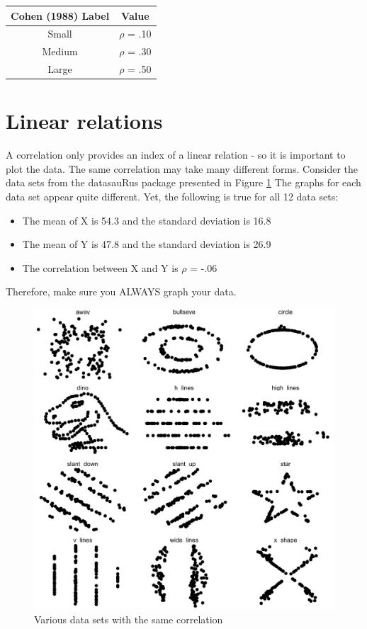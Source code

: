 \documentclass[
]{krantz}
\providecommand{\tightlist}{%
  \setlength{\itemsep}{0pt}\setlength{\parskip}{0pt}}
\begin{document}
\begin{longtable}[]{@{}cc@{}}
\toprule
Cohen (1988) Label & Value\tabularnewline
\midrule
\endhead
Small & \(\rho\) = .10\tabularnewline
Medium & \(\rho\) = .30\tabularnewline
Large & \(\rho\) = .50\tabularnewline
\bottomrule
\end{longtable}

\hypertarget{linear-relations}{%
\section{Linear relations}\label{linear-relations}}

A correlation only provides an index of a linear relation - so it is important to plot the data. The same correlation may take many different forms. Consider the data sets from the datasauRus package presented in Figure \ref{fig:datarex} The graphs for each data set appear quite different. Yet, the following is true for all 12 data sets:

\begin{itemize}
\tightlist
\item
  The mean of X is 54.3 and the standard deviation is 16.8
\item
  The mean of Y is 47.8 and the standard deviation is 26.9
\item
  The correlation between X and Y is \(\rho\) = -.06
\end{itemize}

Therefore, make sure you ALWAYS graph your data.

\begin{figure}
\includegraphics[width=0.8\linewidth,height=0.8\textheight]{ch_populations/images/datarex} \caption{Various data sets with the same correlation}\label{fig:datarex}
\end{figure}
\end{document}

